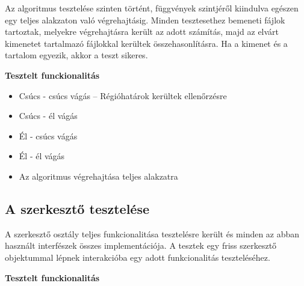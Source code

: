 Az algoritmus tesztelése szinten történt, függvények szintjéről kiindulva egészen egy teljes alakzaton való végrehajtásig. Minden tesztesethez bemeneti fájlok tartoztak, melyekre végrehajtásra került az adott számítás, majd az elvárt kimenetet tartalmazó fájlokkal kerültek összehasonlításra. Ha a kimenet és a tartalom egyezik, akkor a teszt sikeres.

\textbf{Tesztelt funckionalitás}

\begin{itemize}
    \item Csúcs - csúcs vágás -- Régióhatárok kerültek ellenőrzésre
    \item Csúcs - él vágás
    \item Él - csúcs vágás
    \item Él - él vágás
    \item Az algoritmus végrehajtása teljes alakzatra
\end{itemize}


\subsection{A szerkesztő tesztelése}

A szerkesztő osztály teljes funkcionalitása tesztelésre került és minden az abban használt interfészek összes implementációja. A tesztek egy friss szerkesztő objektummal lépnek interakcióba egy adott funkcionalitás teszteléséhez.

\textbf{Tesztelt funckionalitás}

